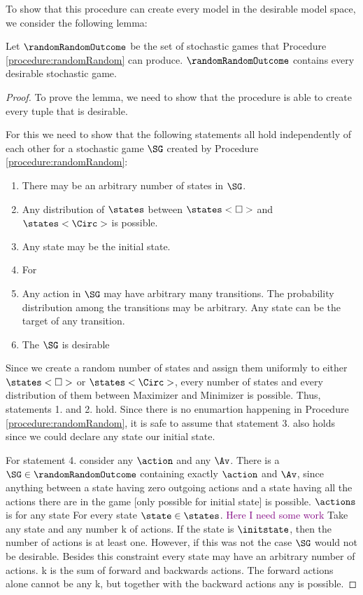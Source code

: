 To show that this procedure can create every model in the desirable model space, we consider the following lemma:
\begin{lemma}
Let $\randomRandomOutcome$ be the set of stochastic games that Procedure \ref{procedure:randomRandom} can produce. $\randomRandomOutcome$ contains every desirable stochastic game.
\end{lemma}
\begin{proof}
To prove the lemma, we need to show that the procedure is able to create every tuple that is desirable.

For this we need to show that the following statements all hold independently of each other for a stochastic game $\SG$ created by Procedure \ref{procedure:randomRandom}:
\begin{enumerate}
\item There may be an arbitrary number of states in $\SG$.
\item Any distribution of $\states$ between $\states<\Box>$ and $\states<\Circ>$ is possible.
\item Any state may be the initial state.
\item For%
\item Any action in $\SG$ may have arbitrary many transitions. The probability distribution among the transitions may be arbitrary. Any state can be the target of any transition.
\item The $\SG$ is desirable
\end{enumerate}


Since we create a random number of states and assign them uniformly to either $\states<\Box>$ or $\states<\Circ>$, every number of states and every distribution of them between Maximizer and Minimizer is possible. Thus, statements 1. and 2. hold. Since there is no enumartion happening in Procedure \ref{procedure:randomRandom}, it is safe to assume that statement 3. also holds since we could declare any state our initial state.

For statement 4. consider any $\action$ and any $\Av$. 
There is a $\SG \in \randomRandomOutcome$ containing exactly $\action$ and $\Av$, since anything between a state having zero outgoing actions and a state having all the actions there are in the game [only possible for initial state] is possible. $\actions$ is for any state  For every state $\state \in \states$.
\textcolor{purple}{Here I need some work}
Take any state and any number k of actions. If the state is $\initstate$, then the number of actions is at least one. However, if this was not the case $\SG$ would not be desirable. Besides this constraint every state may have an arbitrary number of actions. k is the sum of forward and backwards actions. The forward actions alone cannot be any k, but together with the backward actions any is possible. 


\end{proof}
